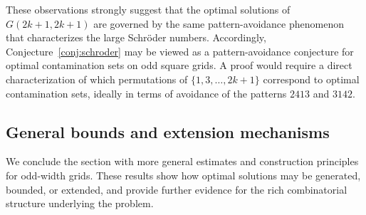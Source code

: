 \documentclass[letterpaper,12pt]{article}
\begin{document}
These observations strongly suggest that the optimal solutions of $G(2k+1,2k+1)$ are governed
by the same pattern-avoidance phenomenon that characterizes the large Schröder numbers.
Accordingly, Conjecture~\ref{conj:schroder} may be viewed as a pattern-avoidance conjecture for
optimal contamination sets on odd square grids. A proof would require a direct characterization
of which permutations of $\{1,3,\dots,2k+1\}$ correspond to optimal contamination sets, ideally
in terms of avoidance of the patterns $2413$ and $3142$.
 
  \subsection{General bounds and extension mechanisms}
 
We conclude the section with more general estimates and construction principles for odd-width grids. These results show how optimal solutions may be generated, bounded, or extended, and provide further evidence for the rich combinatorial structure underlying the problem.
\end{document}
